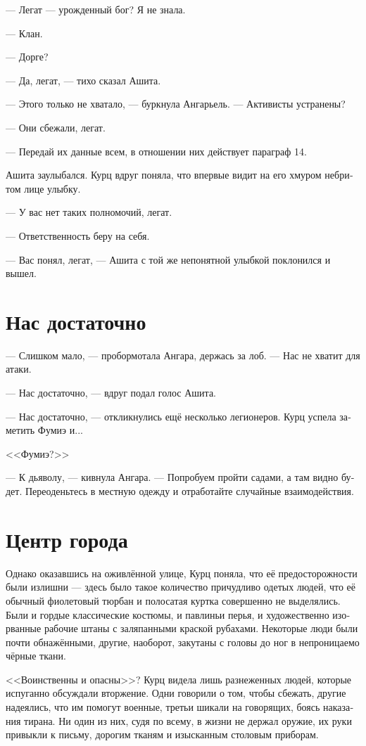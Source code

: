 \documentclass[a4paper,12pt,fleqn]{book}\usepackage{cooltooltips}\usepackage{polyglossia}\setdefaultlanguage[babelshorthands=true]{russian}\setotherlanguage{english}\defaultfontfeatures{Ligatures=TeX,Mapping=tex-text} \usepackage{xcolor}\definecolor{lightgray}{HTML}{bbbbbb}\color{lightgray}\newcommand{\ml}[3]{\textenglish{\textcolor{black}{#3}}}
\begin{document}
--- Легат --- урожденный бог?
Я не знала.

--- Клан.

--- Дорге?

--- Да, легат, --- тихо сказал Ашита.

--- Этого только не хватало, --- буркнула Ангарьель.
--- Активисты устранены?

--- Они сбежали, легат.

--- Передай их данные всем, в отношении них действует параграф 14.

Ашита заулыбался.
Курц вдруг поняла, что впервые видит на его хмуром небритом лице улыбку.

--- У вас нет таких полномочий, легат.

--- Ответственность беру на себя.

--- Вас понял, легат, --- Ашита с той же непонятной улыбкой поклонился и вышел.

\section{Нас достаточно}

--- Слишком мало, --- пробормотала Ангара, держась за лоб.
--- Нас не хватит для атаки.

--- Нас достаточно, --- вдруг подал голос Ашита.

--- Нас достаточно, --- откликнулись ещё несколько легионеров.
Курц успела заметить Фумиэ и...

<<Фумиэ?>>

--- К дьяволу, --- кивнула Ангара.
--- Попробуем пройти садами, а там видно будет.
Переоденьтесь в местную одежду и отработайте случайные взаимодействия.

\section{Центр города}

Однако оказавшись на оживлённой улице, Курц поняла, что её предосторожности были излишни --- здесь было такое количество причудливо одетых людей, что её обычный фиолетовый тюрбан и полосатая куртка совершенно не выделялись.
Были и гордые классические костюмы, и павлиньи перья, и художественно изорванные рабочие штаны с заляпанными краской рубахами.
Некоторые люди были почти обнажёнными, другие, наоборот, закутаны с головы до ног в непроницаемо чёрные ткани.

<<Воинственны и опасны>>?
Курц видела лишь разнеженных людей, которые испуганно обсуждали вторжение.
Одни говорили о том, чтобы сбежать, другие надеялись, что им помогут военные, третьи шикали на говорящих, боясь наказания тирана.
Ни один из них, судя по всему, в жизни не держал оружие, их руки привыкли к письму, дорогим тканям и изысканным столовым приборам.
\end{document}
